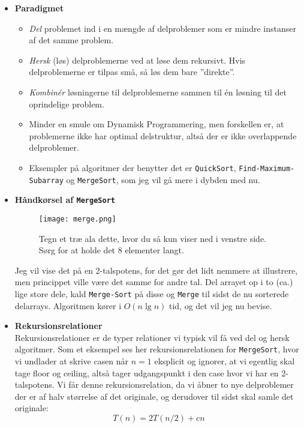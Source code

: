 \begin{itemize}
\item \textbf{Paradigmet} 
\begin{itemize}
	\item \textit{Del} problemet ind i en mængde af delproblemer som er mindre instanser af det samme problem.
	\item \textit{Hersk} (løs) delproblemerne ved at løse dem rekursivt. Hvis delproblemerne er tilpas små, så løs dem bare ''direkte''.
	\item \textit{Kombinér} løsningerne til delproblemerne sammen til én løsning til det oprindelige problem.
	\item Minder en smule om Dynamisk Programmering, men forskellen er, at problemerne ikke har optimal delstruktur, altså der er ikke overlappende delproblemer.
	\item Eksempler på algoritmer der benytter det er \texttt{QuickSort}, \texttt{Find-Maximum-Subarray} og \texttt{MergeSort}, som jeg vil gå mere i dybden med nu.
\end{itemize}


\item \textbf{Håndkørsel af \texttt{MergeSort}}
\begin{figure}[H]
	\begin{center}
		\texttt{[image: merge.png]}
	\end{center}
	\caption{Tegn et træ ala dette, hvor du så kun viser ned i venstre side. Sørg for at holde det 8 elementer langt.}
	\label{fig:merge}
\end{figure}
Jeg vil vise det på en 2-talspotens, for det gør det lidt nemmere at illustrere, men princippet ville være det samme for andre tal. Del arrayet op i to (ca.) lige store dele, kald \texttt{Merge-Sort} på disse og \texttt{Merge} til sidst de nu sorterede delarrays. Algoritmen kører i $O(n \lg n)$ tid, og det vil jeg nu bevise.


\item \textbf{Rekursionsrelationer}\\
Rekursionsrelationer er de typer relationer vi typisk vil få ved del og hersk algoritmer. Som et eksempel ses her rekursionsrelationen for \texttt{MergeSort}, hvor vi undlader at skrive casen når $n = 1$ eksplicit og ignorer, at vi egentlig skal tage floor og ceiling, altså tager udgangspunkt i den case hvor vi har en 2-talspotens. Vi får denne rekursionsrelation, da vi åbner to nye delproblemer der er af halv størrelse af det originale, og derudover til sidst skal samle det originale:
$$
T(n) = 2 T(n/2) + cn
$$




\end{itemize}
